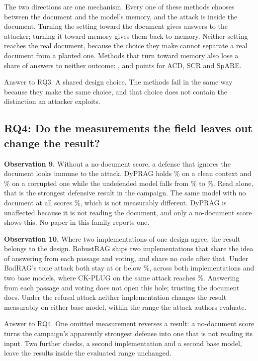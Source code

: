 

The two directions are one mechanism. Every one of these methods chooses
between the document and the model's memory, and the attack is inside the
document. Turning the setting toward the document gives answers to the
attacker; turning it toward memory gives them back to memory. Neither setting
reaches the real document, because the choice they make cannot separate a real
document from a planted one. Methods that turn toward memory also lose a share
of answers to neither outcome: \EAcdResid{}, \EScrResid{} and
\ESpareResid{} points for ACD, SCR and SpARE.

Answer to RQ3. A shared design choice. The methods fail in the same way
because they make the same choice, and that choice does not contain the
distinction an attacker exploits.

\subsection{RQ4: Do the measurements the field leaves out change the result?}

\label{sec:controls}
\textbf{Observation 9.} Without a no-document score, a defense that ignores the
document looks immune to the attack. DyPRAG holds \EDypragClean\% on a clean
context and \EDypragSat\% on a corrupted one while the undefended model falls
from \EDypragRagClean\% to \EDypragRagSat\%. Read alone, that is the strongest
defensive result in the campaign. The same model with no document at all
scores \EDypragNoRet\%, which is not measurably different. DyPRAG is unaffected
because it is not reading the document, and only a no-document score shows
this. No paper in this family reports one.

\textbf{Observation 10.} Where two implementations of one design agree, the
result belongs to the design. RobustRAG ships two implementations that share
the idea of answering from each passage and voting, and share no code after
that. Under BadRAG's tone attack both stay at or below \NRobustToneMax\%,
across both implementations and two base models, where CK-PLUG on the same
attack reaches \ECkSentTop\%. Answering from each passage and voting does not
open this hole; trusting the document does. Under the refusal attack neither
implementation changes the result measurably on either base model, within the
range the attack authors evaluate.

Answer to RQ4. One omitted measurement reverses a result: a no-document score
turns the campaign's apparently strongest defense into one that is not reading
its input. Two further checks, a second implementation and a second base
model, leave the results inside the evaluated range unchanged.

